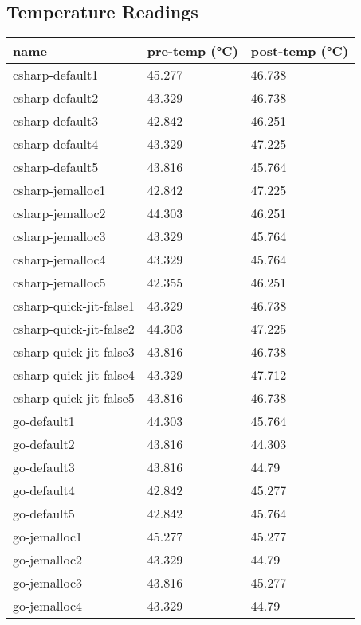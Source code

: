 \subsection{Temperature Readings}
\label{sec:temperature-readings}
\begin{longtable}[H]{|lll|}
\hline
\textbf{name}           & \textbf{pre-temp (°C)} & \textbf{post-temp (°C)} \\
\hline
csharp-default1         & 45.277 & 46.738 \\
csharp-default2         & 43.329 & 46.738 \\
csharp-default3         & 42.842 & 46.251 \\
csharp-default4         & 43.329 & 47.225 \\
csharp-default5         & 43.816 & 45.764 \\
csharp-jemalloc1        & 42.842 & 47.225 \\
csharp-jemalloc2        & 44.303 & 46.251 \\
csharp-jemalloc3        & 43.329 & 45.764 \\
csharp-jemalloc4        & 43.329 & 45.764 \\
csharp-jemalloc5        & 42.355 & 46.251 \\
csharp-quick-jit-false1 & 43.329 & 46.738 \\
csharp-quick-jit-false2 & 44.303 & 47.225 \\
csharp-quick-jit-false3 & 43.816 & 46.738 \\
csharp-quick-jit-false4 & 43.329 & 47.712 \\
csharp-quick-jit-false5 & 43.816 & 46.738 \\
go-default1             & 44.303 & 45.764 \\
go-default2             & 43.816 & 44.303 \\
go-default3             & 43.816 & 44.79  \\
go-default4             & 42.842 & 45.277 \\
go-default5             & 42.842 & 45.764 \\
go-jemalloc1            & 45.277 & 45.277 \\
go-jemalloc2            & 43.329 & 44.79  \\
go-jemalloc3            & 43.816 & 45.277 \\
go-jemalloc4            & 43.329 & 44.79  \\

\end{longtable}

